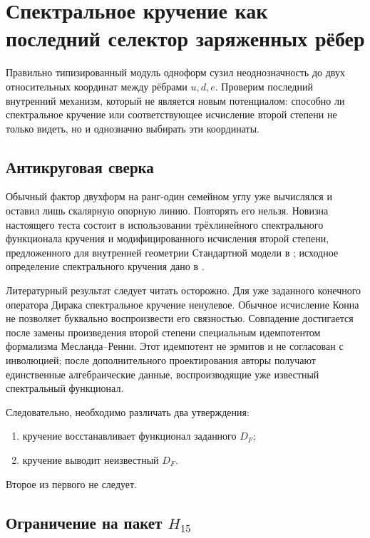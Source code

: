 \chapter{Спектральное кручение как последний селектор заряженных рёбер}

Правильно типизированный модуль одноформ сузил неоднозначность до двух
относительных координат между рёбрами $u,d,e$. Проверим последний внутренний
механизм, который не является новым потенциалом: способно ли спектральное
кручение или соответствующее исчисление второй степени не только видеть,
но и однозначно выбирать эти координаты.

\section{Антикруговая сверка}

Обычный фактор двухформ на ранг-один семейном углу уже вычислялся и оставил
лишь скалярную опорную линию. Повторять его нельзя. Новизна настоящего теста
состоит в использовании трёхлинейного спектрального функционала кручения и
модифицированного исчисления второй степени, предложенного для внутренней
геометрии Стандартной модели в ; исходное определение
спектрального кручения дано в .

Литературный результат следует читать осторожно. Для уже заданного
конечного оператора Дирака спектральное кручение ненулевое. Обычное
исчисление Конна не позволяет буквально воспроизвести его связностью.
Совпадение достигается после замены произведения второй степени специальным
идемпотентом формализма Месланда--Ренни. Этот идемпотент не эрмитов и не
согласован с инволюцией; после дополнительного проектирования авторы
получают единственные алгебраические данные, воспроизводящие уже известный
спектральный функционал.

Следовательно, необходимо различать два утверждения:
\begin{enumerate}
 \item кручение восстанавливает функционал заданного $D_F$;
 \item кручение выводит неизвестный $D_F$.
\end{enumerate}
Второе из первого не следует.

\section{Ограничение на пакет \texorpdfstring{$H_{15}$}{H15}}

